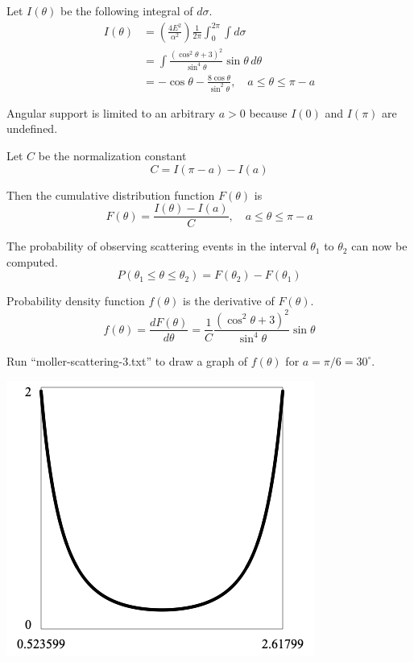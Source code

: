 \documentclass[12pt]{article}
\begin{document}
\noindent
Let $I(\theta)$ be the following integral of $d\sigma$.
\begin{align*}
I(\theta)&=\left(\frac{4E^2}{\alpha^2}\right)\frac{1}{2\pi}\int_0^{2\pi}\int d\sigma
\\
&=\int\frac{\left(\cos^2\theta+3\right)^2}{\sin^4\theta}\sin\theta\,d\theta
\\
&=-\cos\theta-\frac{8\cos\theta}{\sin^2\theta},
\quad a\le\theta\le\pi-a
\end{align*}

\noindent
Angular support is limited to an arbitrary $a>0$ because $I(0)$ and $I(\pi)$ are undefined.

\bigskip
\noindent
Let $C$ be the normalization constant
\begin{equation*}
C=I(\pi-a)-I(a)
\end{equation*}

\noindent
Then the cumulative distribution function $F(\theta)$ is
\begin{equation*}
F(\theta)=\frac{I(\theta)-I(a)}{C},\quad a\le\theta\le\pi-a
\end{equation*}

\noindent
The probability of observing scattering events in the interval $\theta_1$ to $\theta_2$
can now be computed.
\begin{equation*}
P(\theta_1\le\theta\le\theta_2)=F(\theta_2)-F(\theta_1)
\end{equation*}

\noindent
Probability density function $f(\theta)$ is the derivative of $F(\theta)$.
\begin{equation*}
f(\theta)
=\frac{dF(\theta)}{d\theta}
=\frac{1}{C}\frac{\left(\cos^2\theta+3\right)^2}{\sin^4\theta}\sin\theta
\end{equation*}

\noindent
Run ``moller-scattering-3.txt'' to draw a graph of $f(\theta)$ for $a=\pi/6=30^\circ$.

\begin{center}
\includegraphics[scale=0.5]{moller-scattering.png}
\end{center}
\end{document}
